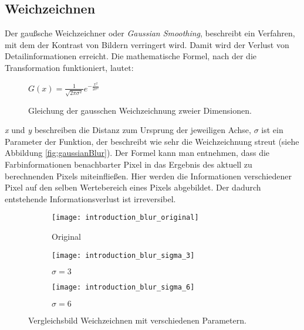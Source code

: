 \subsection{Weichzeichnen}
Der gaußsche Weichzeichner oder \textit{Gaussian Smoothing}, beschreibt ein Verfahren, mit dem der Kontrast von Bildern
verringert wird. Damit wird der Verlust von Detailinformationen erreicht. Die mathematische Formel, nach der die
Transformation funktioniert, lautet:

\parskip\baselineskip

\begin{figure}[h]
    \centering
    \(G(x) = \frac{1}{\sqrt{2 \pi \sigma^2}} e^{-\frac{x^2}{2 \sigma^2}}\)
    \caption{Gleichung der gausschen Weichzeichnung zweier Dimensionen.}
    \label{fig:func-blur}
\end{figure}


\par
\par

\textit{x} und \textit{y} beschreiben die Distanz zum Ursprung der jeweiligen Achse, \textit{\(\sigma\)} ist ein Parameter der Funktion, der
beschreibt wie sehr die Weichzeichnung streut (siehe Abbildung \space \vref*{fig:gaussianBlur}).
Der Formel kann man entnehmen, dass die
Farbinformationen benachbarter Pixel in das Ergebnis des aktuell zu berechnenden Pixels miteinfließen. Hier werden
die Informationen verschiedener Pixel auf den selben Wertebereich eines Pixels abgebildet. Der dadurch entstehende
Informationsverlust ist irreversibel.

\captionsetup[subfigure]{labelformat=empty, labelsep=none}
\begin{figure}[h]
    \centering
    \begin{subfigure}{0.3\textwidth}
        \texttt{[image: introduction\_blur\_original]}
        \caption{\small Original}
    \end{subfigure}
    \begin{subfigure}{0.3\textwidth}
        \texttt{[image: introduction\_blur\_sigma\_3]}
        \caption{\small \(\sigma = 3\)}
    \end{subfigure}
    \begin{subfigure}{0.3\textwidth}
        \texttt{[image: introduction\_blur\_sigma\_6]}
        \caption{\small \(\sigma = 6\)}
    \end{subfigure}

    \caption{Vergleichsbild Weichzeichnen mit verschiedenen Parametern.}
    \label{fig:gaussianBlur}
\end{figure}

